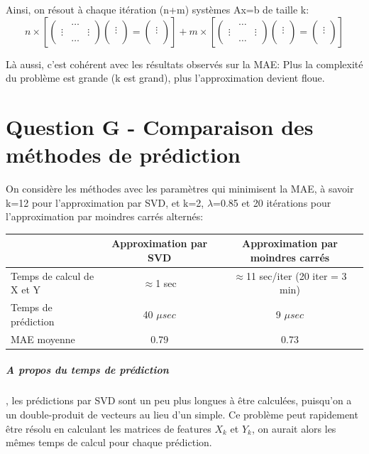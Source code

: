 \documentclass[12pt,a4paper]{article}
\begin{document}
Ainsi, on résout à chaque itération (n+m) systèmes Ax=b de taille k:
$$
n\times \left[  \begin{pmatrix}
 &\dots  & \\ 
\vdots &  &\vdots \\ 
 &\dots  & 
\end{pmatrix}
\begin{pmatrix}
\\ 
\vdots \\ 
\\
\end{pmatrix}
=
\begin{pmatrix}
\\ 
\vdots \\ 
\\
\end{pmatrix}\right ]
+m\times \left[  \begin{pmatrix}
 &\dots  & \\ 
\vdots &  &\vdots \\ 
 &\dots  & 
\end{pmatrix}
\begin{pmatrix}
\\ 
\vdots \\ 
\\
\end{pmatrix}
=
\begin{pmatrix}
\\ 
\vdots \\ 
\\
\end{pmatrix}\right ]
$$

Là aussi, c'est cohérent avec les résultats observés sur la MAE: Plus la complexité du problème est grande (k est grand), plus l'approximation devient floue.
\newpage
\section{Question G - Comparaison des méthodes de prédiction}
On considère les méthodes avec les paramètres qui minimisent la MAE, à savoir k=12 pour l'approximation par SVD, et k=2, $\lambda$=0.85 et 20 itérations pour l'approximation par moindres carrés alternés:
\begin{table}[h]
\begin{tabular}{|l|c|c|}
\hline
 & Approximation par SVD & Approximation par moindres carrés\\
\hline
Temps de calcul de X et Y & $\approx$1 sec & $\approx$11 sec/iter (20 iter = 3 min) \\
\hline
Temps de prédiction & 40 $\mu sec$ & 9 $\mu sec$\\
\hline
MAE moyenne & 0.79 & 0.73 \\
\hline
\end{tabular}
\end{table}
\subparagraph{A propos du temps de prédiction}, les prédictions par SVD sont un peu plus longues à être calculées, puisqu'on a un double-produit de vecteurs au lieu d'un simple. Ce problème peut rapidement être résolu en calculant les matrices de features $X_k$ et $Y_k$, on aurait alors les mêmes temps de calcul pour chaque prédiction.\\
\end{document}
